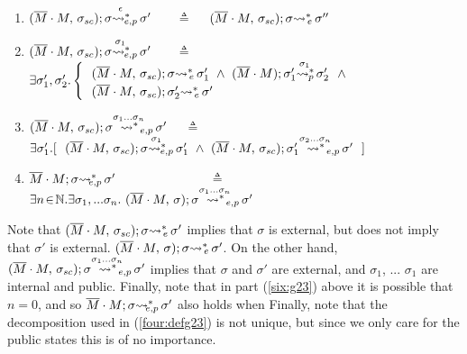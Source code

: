 {\begin{definition}
\begin{enumerate}
\item
$\WithExtPub {\Mtwo\cdot M} {\sigma\bd}  {\sigma}  {\sigma'} {\epsilon}$ \ \      \  $\triangleq$ \ \ 
$\leadstoBoundedThreeStarExt {\Mtwo\cdot M} {\sigma\bd}  {\sigma}  {\sigma''}$

\item
\label{four:defg23a}
$\WithExtPub {\Mtwo\cdot M} {\sigma\bd}  {\sigma}  {\sigma'} {\sigma_1}$  \ \ \  $\triangleq$ \ \ 
$\exists \sigma_1',\sigma_2'.  
\begin{cases}
 \ \   {\leadstoBoundedThreeStarExt {\Mtwo\cdot M} {\sigma\bd}  {\sigma}  {\sigma_1'}}\ \wedge\ 
{\WithPub {\Mtwo\cdot M}    {\sigma_1'}  {\sigma_2'} {\sigma_1}}  \ \ \wedge \\
 \ \  {\leadstoBoundedThreeStarExt {\Mtwo\cdot M} {\sigma\bd}  {\sigma_2'}  {\sigma'}}   \\
  \end{cases}$

 
\item
\label{four:defg23}
$\WithExtPub {\Mtwo\cdot M} {\sigma\bd}  {\sigma}  {\sigma'} {\sigma_1...\sigma_n}$   \ \  $\triangleq$ \ \ 
$\exists \sigma_1'.[ \  \
 \WithExtPub {\Mtwo\cdot M} {\sigma\bd}  {\sigma}  {\sigma_1'} {\sigma_1} 
  \ \wedge \ 
    {\WithExtPub {\Mtwo\cdot M} {\sigma\bd}  {\sigma_1'}  {\sigma'} {\sigma_2...\sigma_n} }   \  \ ]
$

\item
\label{six:g23}
$\leadstoBoundedExtPub {\Mtwo\cdot M}    {\sigma}  {\sigma'} $    \ \ \   \ \ \  \ \ \ \   \ \ \ \  $\triangleq$   \ \ 
 $ \exists n\!\in\! \mathbb{N}. \exists \sigma_1,...\sigma_n. \ \WithExtPub {\Mtwo\cdot M} {\sigma}  {\sigma}  {\sigma'} {\sigma_1...\sigma_n} 
$
\end{enumerate}
\end{definition}

\vspace{.1cm}

Note   that 
${\leadstoBoundedThreeStarExt {\Mtwo\cdot M} {\sigma\bd}  {\sigma}  {\sigma'}}$ implies that $\sigma$ is external, but does not
imply that $\sigma'$ is external.
${\leadstoBoundedThreeStarExt {\Mtwo\cdot M} {\sigma}  {\sigma}  {\sigma'}}$. 
On the other hand, $\WithExtPub {\Mtwo\cdot M} {\sigma\bd}  {\sigma}  {\sigma'} {\sigma_1...\sigma_n}$ implies that $\sigma$ and $\sigma'$ are external, and  $\sigma_1$, ... $\sigma_1$  are internal and public.
Finally, note that   in part (\ref{six:g23}) above it is possible that $n=0$, and so 
$\leadstoBoundedExtPub {\Mtwo\cdot M}    {\sigma}  {\sigma'} $  also holds when
Finally, note that the decomposition used in (\ref{four:defg23}) is not unique, but since we only care for the public states this is of no importance.

}
